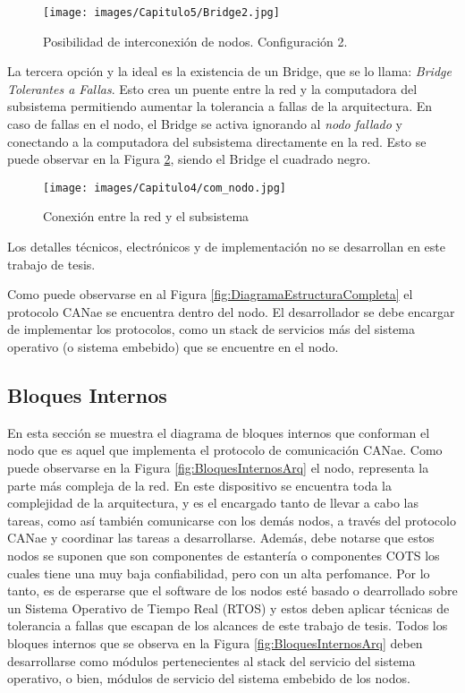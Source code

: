 \begin{figure}[h!]
 \centering
 \texttt{[image: images/Capitulo5/Bridge2.jpg]}
  \caption{Posibilidad de interconexión de nodos. Configuración 2.}
\label{fig:Bridge2}
\end{figure} 

La tercera opción y la ideal es la existencia de un Bridge, que se lo llama: 
\textit{Bridge Tolerantes a Fallas}. Esto crea un puente entre la red y la computadora
del subsistema permitiendo aumentar la tolerancia a fallas de la arquitectura. En 
caso de fallas en el nodo, el Bridge se activa ignorando al \textit{nodo fallado} y 
conectando a la computadora del subsistema directamente en la red.  Esto se puede observar
en la Figura \ref{fig:conn_prop}, siendo el Bridge el cuadrado negro.

\begin{figure}[h!]
 \centering
 \texttt{[image: images/Capitulo4/com\_nodo.jpg]}
 \caption{Conexión entre la red y el subsistema}
\label{fig:conn_prop}
\end{figure}

Los detalles técnicos, electrónicos y de implementación no se desarrollan en
este trabajo de tesis. 

Como puede observarse en al Figura \ref{fig:DiagramaEstructuraCompleta} el
protocolo CANae se encuentra dentro del nodo. El desarrollador se debe encargar
de implementar los protocolos, como un stack de servicios más del 
sistema operativo (o sistema embebido) que se encuentre en el nodo.

\subsection{Bloques Internos}
En esta sección se muestra el diagrama de bloques internos que conforman el
nodo que es aquel que implementa el protocolo de comunicación CANae. Como
puede observarse en la Figura \ref{fig:BloquesInternosArq} el nodo, representa
la parte más compleja de la red. En este dispositivo se encuentra toda la
complejidad de la arquitectura, y es el encargado tanto de llevar a cabo
las tareas, como así también comunicarse con los demás nodos, a través del
protocolo CANae y coordinar las tareas a desarrollarse. Además,
debe notarse que estos nodos se suponen que son componentes de estantería
o componentes \ac{COTS} los cuales tiene una muy baja confiabilidad, pero con 
un alta perfomance. Por lo tanto, es de esperarse que el software de los
nodos esté basado o dearrollado sobre un Sistema Operativo de Tiempo
Real (RTOS) y estos deben aplicar técnicas de tolerancia a fallas que
escapan de los alcances de este trabajo de tesis. Todos los bloques
internos que se observa en la Figura \ref{fig:BloquesInternosArq} deben
desarrollarse como módulos pertenecientes al stack del servicio del
sistema operativo, o bien, módulos de servicio del sistema embebido de
los nodos.

